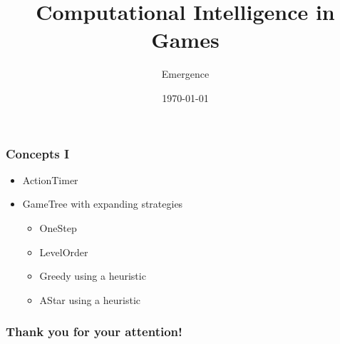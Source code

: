 \documentclass{beamer}
\title{Computational Intelligence in Games}
\author{Emergence}
\date{\today}
\institute{Otto-von-Guericke-University Magdeburg}
\begin{document}
\begin{frame}[plain]
 \titlepage
\end{frame}



\begin{frame}
\frametitle{Concepts I}
\begin{itemize}
 \item ActionTimer
 \item GameTree with expanding strategies
 \begin{itemize}
  \item OneStep
  \item LevelOrder
  \item Greedy using a heuristic
  \item AStar using a heuristic
 \end{itemize}
\end{itemize}
\end{frame}



\begin{frame}
\begin{center}
\frametitle{Thank you for your attention!}
\end{center}
\end{frame}
\end{document}
